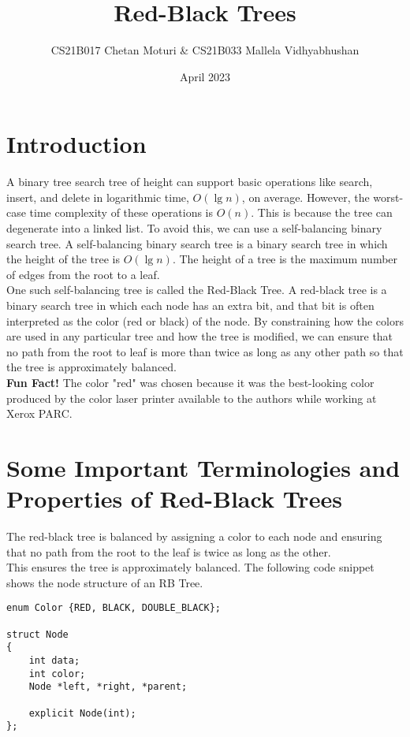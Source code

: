 \documentclass{article}
\title{Red-Black Trees}
\author{CS21B017 Chetan Moturi & CS21B033 Mallela Vidhyabhushan}
\date{April 2023}
\begin{document}
\maketitle

\section{Introduction}
A binary tree search tree of height can support basic operations like search, insert, and delete in logarithmic 
time, $O(\lg n)$, on average. However, the worst-case time complexity of these operations is $O(n)$. 
This is because the tree can degenerate into a linked list. To avoid this, we can use a self-balancing 
binary search tree. A self-balancing binary search tree is a binary search tree in which the height of the
tree is $O(\lg n)$. The height of a tree is the maximum number of edges from the root to a leaf. \\
One such self-balancing tree is called the Red-Black Tree. A red-black tree is a binary search tree in
which each node has an extra bit, and that bit is often interpreted as the color (red or black) of the
node. By constraining how the colors are used in any particular tree and how the tree is modified, we
can ensure that no path from the root to leaf is more than twice as long as any other path so that the
tree is approximately balanced. \\
\textbf{Fun Fact!}
The color "red" was chosen because it was the best-looking color produced by the color laser printer 
available to the authors while working at Xerox PARC.

\pagebreak

\section{Some Important Terminologies and Properties of Red-Black Trees}
The red-black tree is balanced by assigning a color to each node and ensuring that no path from the root to the leaf is twice as long as the other.\\
This ensures the tree is approximately balanced. The following code snippet shows the node structure of an RB Tree.

\begin{lstlisting}
enum Color {RED, BLACK, DOUBLE_BLACK};

struct Node
{
    int data;
    int color;
    Node *left, *right, *parent;

    explicit Node(int);
};
\end{lstlisting}
\end{document}
